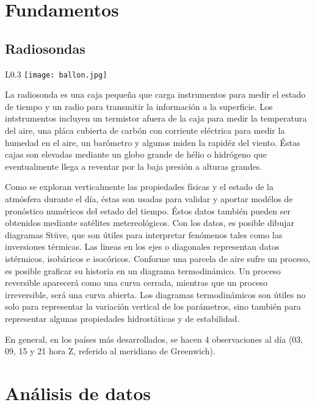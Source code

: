 \documentclass[12pt]{article}
\begin{document}
\section{Fundamentos}

\subsection*{Radiosondas}

\noindent
\begin{wrapfigure}{L}{0.3\textwidth}
\texttt{[image: ballon.jpg]}
\end{wrapfigure}

La radiosonda es una caja pequeña que carga instrumentos para medir el estado de tiempo y un radio para transmitir la informaci\'on a la superficie. Los intstrumentos incluyen un termistor afuera de la caja para medir la temperatura del aire, una pl\'aca cubierta de carb\'on con corriente el\'ectrica para medir la humedad en el aire, un bar\'ometro y algunos miden la rapid\'ez del viento. \'Estas cajas son elevadas mediante un globo grande de h\'elio o hidr\'ogeno que eventualmente llega a reventar por la baja presi\'on a alturas grandes. 

Como se exploran verticalmente las propiedades f\'isicas y el estado de la atm\'osfera durante el d\'ia, \'estas son usadas para validar y aportar mod\'elos de pron\'ostico num\'ericos del estado del tiempo. \'Estos datos tambi\'en pueden ser obtenidos mediante sat\'elites metereol\'ogicos. Con los datos, es posible dibujar diagramas Stüve, que son útiles para interpretar fenómenos tales como las inversiones térmicas. Las lineas en los ejes o diagonales representan datos ist\'ermicos, isob\'aricos e isoc\'oricos. Conforme una parcela de aire sufre un proceso, es posible graficar su historia en un diagrama termodinámico. Un proceso reversible aparecerá como una curva cerrada, mientras que un proceso irreversible, será una curva abierta. Los diagramas termodinámicos son útiles no solo para representar la variación vertical de los parámetros, sino también para representar algunas propiedades hidrostáticas y de estabilidad.

En general, en los países más desarrollados, se hacen 4 observaciones al día (03, 09, 15 y 21 hora Z, referido al meridiano de Greenwich).

\section{An\'alisis de datos}
\noindent
\end{document}
